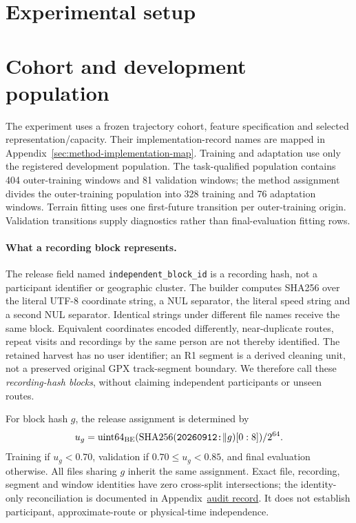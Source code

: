 \section{Experimental setup}
\label{sec:protocol}\hypertarget{sec:protocol}{}

\section{Cohort and development population}
The experiment uses a frozen trajectory cohort, feature specification and
selected representation/capacity. Their implementation-record names are
mapped in Appendix~\ref{sec:method-implementation-map}. Training and
adaptation use only the registered development population. The task-qualified
population contains 404 outer-training windows and 81 validation windows;
the method assignment divides the outer-training population into 328 training
and 76 adaptation windows. Terrain fitting uses one first-future transition
per outer-training origin. Validation transitions supply diagnostics rather
than final-evaluation fitting rows.

\paragraph{What a recording block represents.}
The release field named \texttt{independent\_block\_id} is a recording hash,
not a participant identifier or geographic cluster. The builder computes
SHA256 over the literal UTF-8 coordinate string, a NUL separator, the literal
speed string and a second NUL separator. Identical strings under different
file names receive the same block. Equivalent coordinates encoded differently,
near-duplicate routes, repeat visits and recordings by the same person are
not thereby identified. The retained harvest has no user identifier; an R1
segment is a derived cleaning unit, not a preserved original GPX track-segment
boundary. We therefore call these \emph{recording-hash blocks}, without
claiming independent participants or unseen routes.

For block hash \(g\), the release assignment is determined by
\[
u_g=\operatorname{uint64}_{\rm BE}
(\operatorname{SHA256}(\texttt{20260912:}\Vert g)[0:8])/2^{64}.
\]
Training if \(u_g<0.70\), validation if \(0.70\leq u_g<0.85\), and final
evaluation otherwise. All files sharing \(g\) inherit the same assignment.
Exact file, recording, segment and window identities have zero cross-split
intersections; the identity-only reconciliation is documented in
Appendix~\href{audit-notes.pdf\#sec:source-reconciliation-details}{audit record}. It does not establish
participant, approximate-route or physical-time independence.

